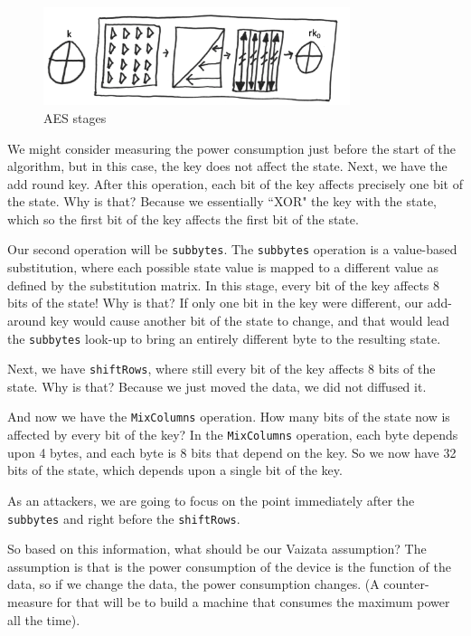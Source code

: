 \begin{figure}[!ht]
    \centering
    \includegraphics[width=0.8\textwidth]{images/Lecture6/AES-stages-figure.png}
    \caption{AES stages} \label{fig:aes-stages}
\end{figure}

We might consider measuring the power consumption just before the start of the algorithm, but in this case, the key does not affect the state.
Next, we have the add round key. 
After this operation, each bit of the key affects precisely one bit of the state.
Why is that? 
Because we essentially ``XOR" the key with the state, which so the first bit of the key affects the first bit of the state.

Our second operation will be \texttt{subbytes}. 
The \texttt{subbytes} operation is a value-based substitution, where each possible state value is mapped to a different value as defined by the substitution matrix. 
In this stage, every bit of the key affects 8 bits of the state! Why is that? 
If only one bit in the key were different, our add-around key would cause another bit of the state to change, and that would lead the \texttt{subbytes} look-up to bring an entirely different byte to the resulting state.

Next, we have \texttt{shiftRows}, where still every bit of the key affects 8 bits of the state. 
Why is that? 
Because we just moved the data, we did not diffused it.

And now we have the \texttt{MixColumns} operation. 
How many bits of the state now is affected by every bit of the key? 
In the \texttt{MixColumns} operation, each byte depends upon 4 bytes, and each byte is 8 bits that depend on the key. 
So we now have 32 bits of the state, which depends upon a single bit of the key.

As an attackers, we are going to focus on the point immediately after the \texttt{subbytes} and right before the \texttt{shiftRows}. 

So based on this information, what should be our Vaizata assumption?
The assumption is that is the power consumption of the device is the function of the data, so if we change the data, the power consumption changes.
(A counter-measure for that will be to build a machine that consumes the maximum power all the time).

